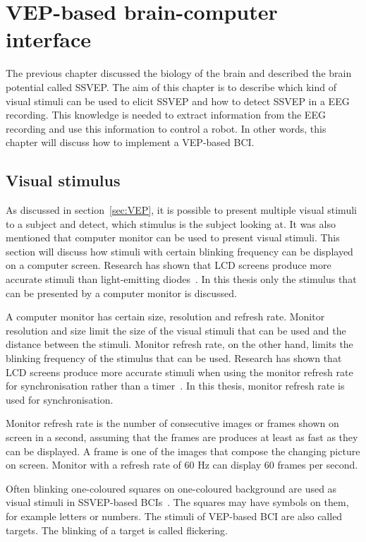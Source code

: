 
\chapter{VEP-based brain-computer interface}

The previous chapter discussed the biology of the brain and described the brain potential called \gls{SSVEP}. The aim of this chapter is to describe which kind of visual stimuli can be used to elicit \gls{SSVEP} and how to detect \gls{SSVEP} in a \gls{EEG} recording. This knowledge is needed to extract information from the \gls{EEG} recording and use this information to control a robot. In other words, this chapter will discuss how to implement a \gls{VEP}-based \gls{BCI}.

\section{Visual stimulus}
\label{sec:stimuli}

As discussed in section~\ref{sec:VEP}, it is possible to present multiple visual stimuli to a subject and detect, which stimulus is the subject looking at. It was also mentioned that computer monitor can be used to present visual stimuli. This section will discuss how stimuli with certain blinking frequency can be displayed on a computer screen. Research has shown that LCD screens produce more accurate stimuli than light-emitting diodes~\cite{lcd_lcd_led}. In this thesis only the stimulus that can be presented by a computer monitor is discussed.

A computer monitor has certain size, resolution and refresh rate. Monitor resolution and size limit the size of the visual stimuli that can be used and the distance between the stimuli. Monitor refresh rate, on the other hand, limits the blinking frequency of the stimulus that can be used. Research has shown that LCD screens produce more accurate stimuli when using the monitor refresh rate for synchronisation rather than a timer~\cite{lcd_lcd_led}. In this thesis, monitor refresh rate is used for synchronisation.

Monitor refresh rate is the number of consecutive images or frames shown on screen in a second, assuming that the frames are produces at least as fast as they can be displayed. A frame is one of the images that compose the changing picture on screen. Monitor with a refresh rate of 60 Hz can display 60 frames per second. 

Often blinking one-coloured squares on one-coloured background are used as visual stimuli in \gls{SSVEP}-based \glspl{BCI}~\cite{ssvep_stim}. The squares may have symbols on them, for example letters or numbers. The stimuli of \gls{VEP}-based \gls{BCI} are also called \glspl{target}. The blinking of a target is called \gls{flickering}.

